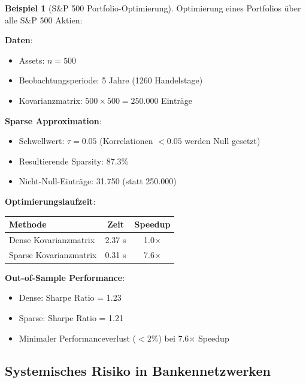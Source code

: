 ﻿\documentclass[a4paper,12pt]{report}
\theoremstyle{definition}
\newtheorem{beispiel}{Beispiel}
\begin{document}
	\begin{beispiel}[S\&P 500 Portfolio-Optimierung]
		Optimierung eines Portfolios über alle S\&P 500 Aktien:
		
		\textbf{Daten}:
		\begin{itemize}
			\item Assets: $n = 500$
			\item Beobachtungsperiode: 5 Jahre (1260 Handelstage)
			\item Kovarianzmatrix: $500 \times 500 = 250.000$ Einträge
		\end{itemize}
		
		\textbf{Sparse Approximation}:
		\begin{itemize}
			\item Schwellwert: $\tau = 0.05$ (Korrelationen $< 0.05$ werden Null gesetzt)
			\item Resultierende Sparsity: 87.3\%
			\item Nicht-Null-Einträge: 31.750 (statt 250.000)
		\end{itemize}
		
		\textbf{Optimierungslaufzeit}:
		\begin{center}
			\begin{tabular}{|l|c|c|}
				\hline
				\textbf{Methode} & \textbf{Zeit} & \textbf{Speedup} \\
				\hline
				Dense Kovarianzmatrix & 2.37 s & 1.0$\times$ \\
				Sparse Kovarianzmatrix & 0.31 s & 7.6$\times$ \\
				\hline
			\end{tabular}
		\end{center}
		
		\textbf{Out-of-Sample Performance}:
		\begin{itemize}
			\item Dense: Sharpe Ratio = 1.23
			\item Sparse: Sharpe Ratio = 1.21
			\item Minimaler Performanceverlust ($< 2\%$) bei 7.6$\times$ Speedup
		\end{itemize}
	\end{beispiel}
	
	\subsection{Systemisches Risiko in Bankennetzwerken}
	
\end{document}
